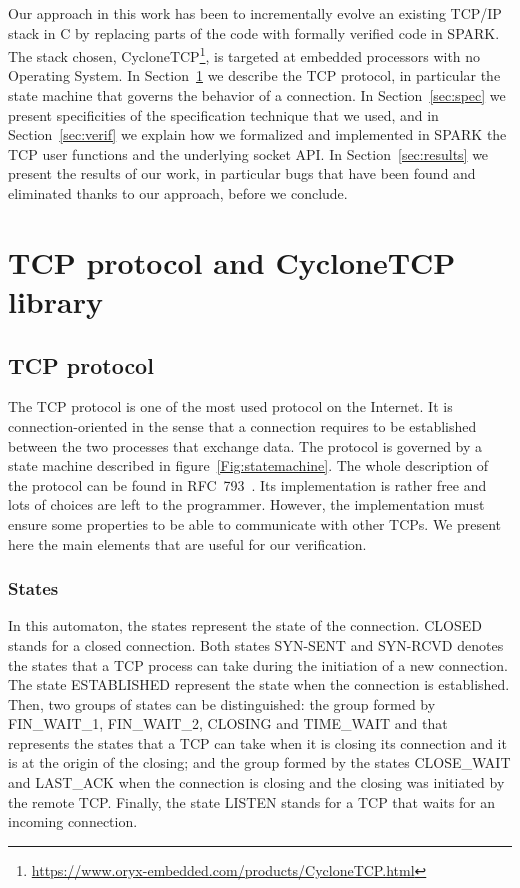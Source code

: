 \documentclass[runningheads]{llncs}
\let\state\textsf
\begin{document}
    Our approach in this work has been to incrementally evolve an existing TCP/IP stack in C by replacing parts of the code with formally verified code in SPARK.
    The stack chosen, CycloneTCP\footnote{\url{https://www.oryx-embedded.com/products/CycloneTCP.html}}, is targeted at embedded processors with no Operating System.
    In Section~\ref{sec:TCP} we describe the TCP protocol, in particular the state machine that governs the behavior of a connection.
    In Section~\ref{sec:spec} we present specificities of the specification technique that we used, and in Section~\ref{sec:verif} we explain how we formalized and implemented in SPARK the TCP user functions and the underlying socket API.
    In Section~\ref{sec:results} we present the results of our work, in particular bugs that have been found and eliminated thanks to our approach, before we conclude.

\section{TCP protocol and CycloneTCP library}
\label{sec:TCP}

\subsection{TCP protocol}

The TCP protocol is one of the most used protocol on the Internet.
It is connection-oriented in the sense that a connection requires to be
established between the two processes that exchange data. The protocol is
governed by a state machine described in figure~\ref{Fig:statemachine}.
The whole description of the protocol can be found in RFC~793~\cite{rfc793}.
Its implementation is rather free and lots of choices are left to the programmer.
However, the implementation must ensure some properties to be able to communicate
with other TCPs.
We present here the main elements that are useful for our verification.



\subsubsection{States}

In this automaton, the states represent the state of the connection. \state{CLOSED}
stands for a closed connection. Both states \state{SYN-SENT} and \state{SYN-RCVD} denotes
the states that a TCP process can take during the initiation  of a new connection. The state
\state{ESTABLISHED} represent the state when the connection is established. Then, two groups
of states can be distinguished: the group formed by \state{FIN\_WAIT\_1}, \state{FIN\_WAIT\_2},
\state{CLOSING} and \state{TIME\_WAIT} and that represents the states that a TCP can take
when it is closing its connection and it is at the origin of the closing; and the group formed
by the states \state{CLOSE\_WAIT} and \state{LAST\_ACK} when the connection is closing
and the closing was initiated by the remote TCP.
Finally, the state \state{LISTEN} stands for a TCP that waits for an incoming connection.
\end{document}
